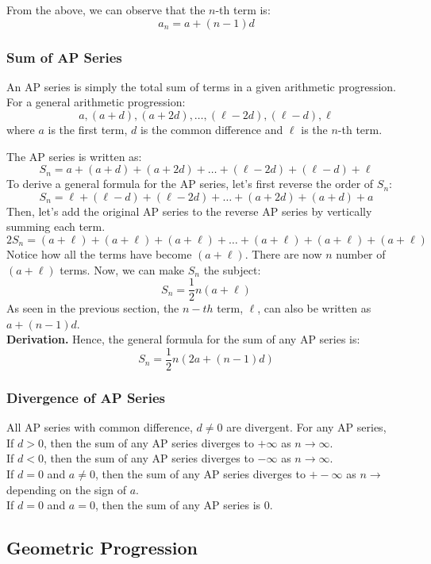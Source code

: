 \documentclass[12pt]{article}
\begin{document}
From the above, we can observe that the $n$-th term is:
\[
	a_n = a + (n-1)d
\]

\subsubsection{Sum of AP Series}

An AP series is simply the total sum of terms in a given arithmetic progression. For a general arithmetic progression:
\[
	a, (a + d), (a + 2d), \dots, (\ell - 2d), (\ell - d), \ell
\]
where $a$ is the first term, $d$ is the common difference and $\ell$ is the $n$-th term.

The AP series is written as:
\[
	S_n = a + (a + d) + (a + 2d) + \dots + (\ell - 2d) + (\ell - d) + \ell
\]
To derive a general formula for the AP series, let's first reverse the order of $S_n$:
\[
	S_n = \ell + (\ell - d) + (\ell - 2d) + \dots + (a + 2d) + (a + d) + a
\]
Then, let's add the original AP series to the reverse AP series by vertically summing each term.
\[
	2S_n = (a + \ell) + (a + \ell) + (a + \ell) + \dots + (a + \ell) + (a + \ell) + (a + \ell)
\]
Notice how all the terms have become $(a + \ell)$. There are now $n$ number of $(a + \ell)$ terms. Now, we can make $S_n$ the subject:
\[
	S_n = \frac{1}{2}n(a + \ell)
\]
As seen in the previous section, the $n-th$ term, $\ell$, can also be written as $a + (n - 1)d$.  \\
\textbf{Derivation.} Hence, the general formula for the sum of any AP series is:
\[
	S_n = \frac{1}{2}n(2a + (n-1)d)
\]

\subsubsection{Divergence of AP Series}

All AP series with common difference, $d \neq 0$ are divergent. For any AP series,  \\
If $d > 0$, then the sum of any AP series diverges to $+\infty$ as $n \rightarrow \infty$.  \\  
If $d < 0$, then the sum of any AP series diverges to $-\infty$ as $n \rightarrow \infty$.  \\ 
If $d = 0$ and $a \neq 0$, then the sum of any AP series diverges to $+-\infty$ as $n \rightarrow$ depending on the sign of $a$. \\
If $d = 0$ and $a = 0$, then the sum of any AP series is $0$.

\subsection{Geometric Progression}
\end{document}
